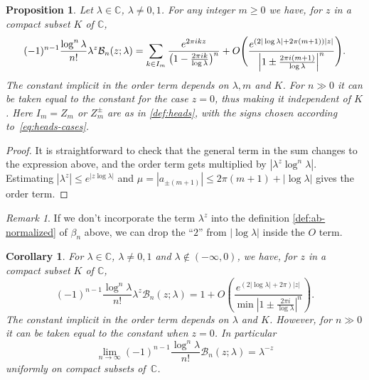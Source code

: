\documentclass[11pt,a4paper]{amsart}
\newcommand{\C}{\mathbb{C}}
\newcommand{\B}{\mathcal{B}}
\theoremstyle{plain}
\newtheorem{corollary}[theorem]{Corollary}
\newtheorem{prop}[theorem]{Proposition}
\theoremstyle{remark}
\newtheorem{remark}{Remark}
\begin{document}
\begin{prop}
\label{prop:approx-AB-mod}
Let $\lambda \in \C$, $\lambda \neq 0,1$.
For any integer $m \geq 0$ we have, for $z$ in a compact subset $K$ of $\C$,
%
\begin{equation}
\label{eq:approx-AB-mod}
	(-1)^{n-1} \frac{\log^{n} \lambda}{n!} \lambda^{z} \B_{n}(z;\lambda)
	= \sum_{k \in I_{m}} \frac{e^{2\pi i k z}}{\bigl(1- \frac{2\pi i k}{\log\lambda}\bigr)^{n}}
	                       + O\Biggl(
	                          \frac{e^{(2|\log\lambda|+2\pi(m+1))|z|}}
	                               {\Bigl|1 \pm \frac{2\pi i(m+1)}{\log\lambda}\Bigr|^{n}}
	                          \Biggr).
\end{equation}
%
The constant implicit in the order term depends on $\lambda,m$ and $K$. For $n \gg 0$ it can be taken equal to the constant for the case $z=0$, thus making it independent of $K$.
Here $I_{m} = Z_{m}$ or $Z_{m}^{\pm}$ are as in \eqref{def:heads},
with the signs chosen according to~\eqref{eq:heads-cases}.
\end{prop}

\begin{proof}
It is straightforward to check that the general term in the sum changes to the expression above, and the order term gets multiplied by $|\lambda^{z} \log^{n}\lambda|$. Estimating
$|\lambda^{z}| \leq e^{|z\log\lambda|}$ and $\mu = |a_{\pm(m+1)}| \leq 2\pi(m+1) + |\log\lambda|$ gives the order term.
\end{proof}

\begin{remark}
If we don't incorporate the term $\lambda^{z}$ into the definition \eqref{def:ab-normalized} of 
$\beta_{n}$ above, we can drop the ``$2$'' from $|\log\lambda|$ inside the $O$ term.
\end{remark}


\begin{corollary}
\label{cor:0th-approx}
For $\lambda \in \C$, $\lambda \neq 0,1$ and $\lambda \notin (-\infty,0)$, we have, for $z$ in a compact subset $K$ of $\C$,
$$
	(-1)^{n-1} \frac{\log^{n} \lambda}{n!} \lambda^{z} \B_{n}(z;\lambda)
	= 1 
      + O\left(
         \frac{e^{(2|\log\lambda|+2\pi)|z|}}{\min\left|1 \pm \frac{2\pi i}{\log\lambda}\right|^{n}}
         \right).
$$
The constant implicit in the order term depends on $\lambda$ and $K$. However, for $n \gg 0$ it can be taken equal to the constant when $z=0$.
In particular
$$
	\lim_{n \to \infty} (-1)^{n-1} \frac{\log^{n} \lambda}{n!} \B_{n}(z;\lambda)
	= \lambda^{-z}
$$
uniformly on compact subsets of~$\C$.
\end{corollary}
\end{document}
